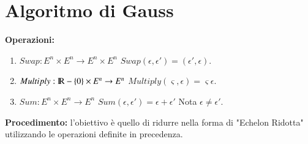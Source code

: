 \documentclass[12pt,a4paper]{article}
\theoremstyle{break}
\newcommand\R{{\rm I\!R}}
\begin{document}
    \section{Algoritmo di Gauss}
    \textbf{Operazioni:}
    \begin{enumerate}
        \item $Swap: E^n\times E^n \rightarrow E^n\times E^n$ $Swap(\epsilon,\epsilon') = (\epsilon',\epsilon)$.
        \item $Multiply: \R-\{0\}\times E^n\rightarrow E^n$ $Multiply(\varsigma, \epsilon)=\varsigma\epsilon$.
        \item $Sum: E^n\times E^n \rightarrow E^n$ $Sum(\epsilon, \epsilon') = \epsilon + \epsilon'$ Nota $\epsilon\neq\epsilon'$.
    \end{enumerate}
    \textbf{Procedimento:}\newline
    l'obiettivo è quello di ridurre nella forma di "Echelon Ridotta" utilizzando le operazioni definite in precedenza.
\end{document}
